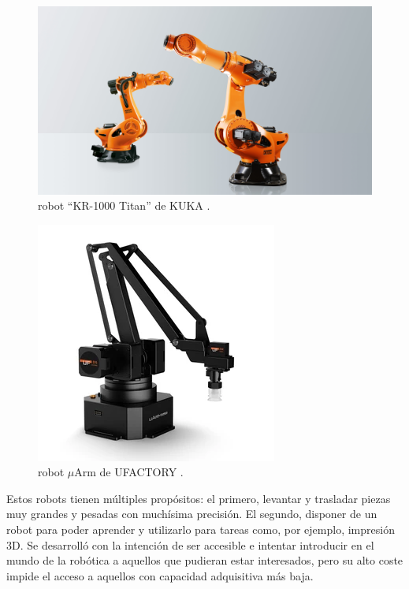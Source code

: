 \begin{figure}[H]
    \centering
    \includegraphics[width=.75\linewidth]{pictures/kr1000.jpg}
    \caption{robot ``KR-1000 Titan'' de KUKA \cite{noauthor_kr_nodate}.}
    \label{fig:kuka}
\end{figure}

\begin{figure}[H]
    \centering
    \includegraphics[width=.5\linewidth]{pictures/uarm.png}
    \caption{robot $\mu$Arm de UFACTORY \cite{noauthor_ufactory_nodate-1}.}
    \label{fig:uarm}
\end{figure}

Estos robots tienen múltiples propósitos: el primero, levantar y trasladar piezas
muy grandes y pesadas con muchísima precisión. El segundo, disponer de un robot
para poder aprender y utilizarlo para tareas como, por ejemplo, impresión 3D. 
Se desarrolló con la intención de ser accesible e intentar introducir en el mundo
de la robótica a aquellos que pudieran estar interesados, pero su alto coste impide
el acceso a aquellos con capacidad adquisitiva más baja.